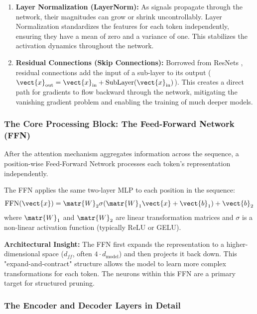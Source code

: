 \begin{enumerate}
    \item \textbf{Layer Normalization (LayerNorm):} As signals propagate through the network, their magnitudes can grow or shrink uncontrollably. Layer Normalization standardizes the features for each token independently, ensuring they have a mean of zero and a variance of one. This stabilizes the activation dynamics throughout the network.


    \item \textbf{Residual Connections (Skip Connections):} Borrowed from ResNets \cite{He2016}, residual connections add the input of a sub-layer to its output ($\vect{x}_{\text{out}} = \vect{x}_{\text{in}} + \text{SubLayer}(\vect{x}_{\text{in}})$). This creates a direct path for gradients to flow backward through the network, mitigating the vanishing gradient problem and enabling the training of much deeper models.

\end{enumerate}
\subsubsection{The Core Processing Block: The Feed-Forward Network (FFN)}

After the attention mechanism aggregates information across the sequence, a position-wise Feed-Forward Network processes each token's representation independently.

The FFN applies the same two-layer MLP to each position in the sequence:
  \begin{equation}
    \text{FFN}(\vect{x}) = \matr{W}_2 \sigma(\matr{W}_1 \vect{x} + \vect{b}_1) + \vect{b}_2
  \end{equation}
  where $\matr{W}_1$ and $\matr{W}_2$ are linear transformation matrices and $\sigma$ is a non-linear activation function (typically ReLU or GELU).

\textbf{Architectural Insight:} The FFN first expands the representation to a higher-dimensional space ($d_{ff}$, often $4 \cdot d_{\text{model}}$) and then projects it back down. This "expand-and-contract" structure allows the model to learn more complex transformations for each token. The neurons within this FFN are a primary target for structured pruning.

\subsubsection{The Encoder and Decoder Layers in Detail}

